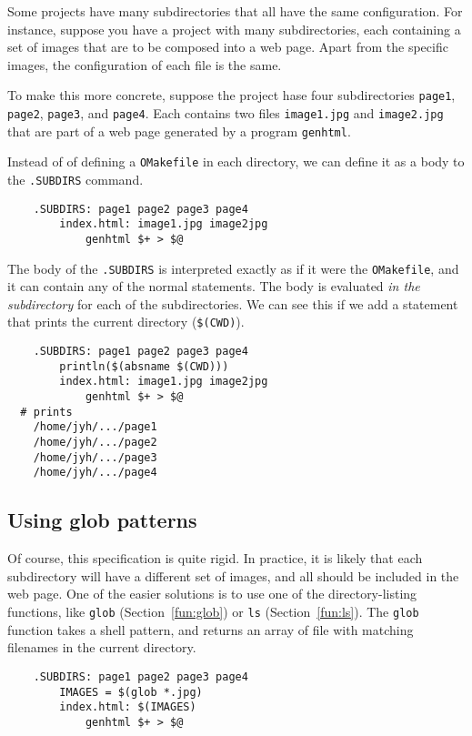 Some projects have many subdirectories that all have the same configuration.  For instance, suppose
you have a project with many subdirectories, each containing a set of images that are to be composed
into a web page.  Apart from the specific images, the configuration of each file is the same.

To make this more concrete, suppose the project hase four subdirectories \verb+page1+, \verb+page2+,
\verb+page3+, and \verb+page4+.  Each contains two files \verb+image1.jpg+ and \verb+image2.jpg+
that are part of a web page generated by a program \verb+genhtml+.

Instead of of defining a \verb+OMakefile+ in each directory, we can define it as a body to the
\verb+.SUBDIRS+ command.

\begin{verbatim}
    .SUBDIRS: page1 page2 page3 page4
        index.html: image1.jpg image2jpg
            genhtml $+ > $@
\end{verbatim}

The body of the \verb+.SUBDIRS+ is interpreted exactly as if it were the \verb+OMakefile+, and it
can contain any of the normal statements.  The body is evaluated \emph{in the subdirectory} for each
of the subdirectories.  We can see this if we add a statement that prints the current directory
(\verb+$(CWD)+).

\begin{verbatim}
    .SUBDIRS: page1 page2 page3 page4
        println($(absname $(CWD)))
        index.html: image1.jpg image2jpg
            genhtml $+ > $@
  # prints
    /home/jyh/.../page1
    /home/jyh/.../page2
    /home/jyh/.../page3
    /home/jyh/.../page4
\end{verbatim}

\subsection{Using glob patterns}

Of course, this specification is quite rigid.  In practice, it is likely that each subdirectory will
have a different set of images, and all should be included in the web page.  One of the easier
solutions is to use one of the directory-listing functions, like
\verb+glob+ (Section~\ref{fun:glob}) or \verb+ls+ (Section~\ref{fun:ls}).
The \verb+glob+ function takes a shell pattern, and returns an array of
file with matching filenames in the current directory.

\begin{verbatim}
    .SUBDIRS: page1 page2 page3 page4
        IMAGES = $(glob *.jpg)
        index.html: $(IMAGES)
            genhtml $+ > $@
\end{verbatim}

